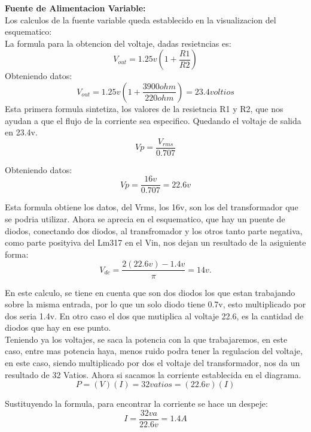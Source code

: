 \documentclass[14pt,a4paper]{article}
\begin{document}
\textbf{Fuente de Alimentacion Variable:\\}
Los calculos de la fuente variable queda establecido en la visualizacion del esquematico:\\
La formula para la obtencion del voltaje, dadas resietncias es:\\
$$ V_{out}= 1.25v(1+\frac{R1}{R2}) $$
Obteniendo datos:\\
$$ V_{out}= 1.25v(1+\frac{3900 ohm}{220 ohm})=23.4 voltios $$
Esta primera formula sintetiza, los valores de la resietncia R1 y R2, que nos ayudan a que el flujo de la corriente sea especifico. Quedando el voltaje de salida en 23.4v.\\

$$ Vp= \frac{V_{rms}}{0.707} $$

Obteniendo datos:\\

$$ Vp=\frac{16v}{0.707}= 22.6 v $$

Esta formula obtiene los datos, del Vrms, los 16v, son los del transformador que se podria utilizar. Ahora se aprecia en el esquematico, que hay un puente de diodos, conectando dos diodos, al transfromador y los otros tanto parte negativa, como parte posityiva del Lm317 en el Vin, nos dejan un resultado de la asiguiente forma:\\

$$ V_{dc}=\frac{2(22.6v)-1.4v}{\pi}= 14 v. $$

En este calculo, se tiene en cuenta que son dos diodos los que estan trabajando sobre la misma entrada, por lo que un solo diodo tiene 0.7v, esto multiplicado por dos seria 1.4v. En otro caso el dos que mutiplica al voltaje 22.6, es la cantidad de diodos que hay en ese punto.\\
Teniendo ya los voltajes, se saca la potencia con la que trabajaremos, en este caso, entre mas potencia haya, menos ruido podra tener la regulacion del voltaje, en este caso, siendo multiplicado por dos el voltaje del transformador, nos da un resultado de 32 Vatios. Ahora si sacamos la corriente establecida en el diagrama.\\

$$ P= (V)(I)= 32vatios=(22.6v)(I) $$

Sustituyendo la formula, para encontrar la corriente se hace un despeje:\\

$$ I= \frac{32va}{22.6v}= 1.4 A $$
\end{document}
